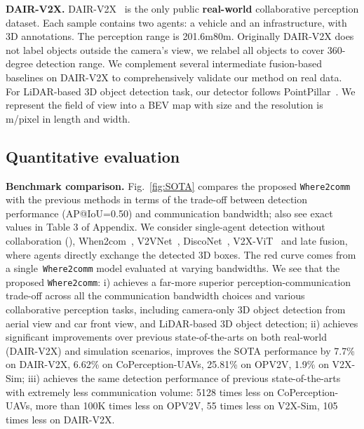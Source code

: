 \documentclass{article}
\begin{document}
\textbf{DAIR-V2X.} DAIR-V2X~\cite{dair} is the only public \textbf{real-world} collaborative perception dataset. Each sample contains two agents: a vehicle and an infrastructure, with 3D annotations. The perception range is 201.6m80m.  Originally DAIR-V2X does not label objects outside the camera's view, we relabel all objects to cover 360-degree detection range. We complement several intermediate fusion-based baselines on DAIR-V2X to comprehensively validate our method on real data. For LiDAR-based 3D object detection task, our detector follows PointPillar~\cite{PointPillar}. We represent the field of view into a BEV map with size  and the resolution is m/pixel in length and width.




\vspace{-2mm}
\subsection{Quantitative evaluation}
\vspace{-2mm}




\textbf{Benchmark comparison.} Fig.~\ref{fig:SOTA} compares the proposed \texttt{Where2comm} with the previous methods in terms of the trade-off between detection performance (AP@IoU=0.50) and communication bandwidth; also see exact values in Table 3 of Appendix. We consider single-agent detection without collaboration (), When2com~\cite{when2com}, V2VNet~\cite{v2vnet}, DiscoNet~\cite{disconet}, V2X-ViT~\cite{xu2022v2x} and late fusion, where agents directly exchange the detected 3D boxes. The red curve comes from a single~\texttt{Where2comm} model evaluated at varying bandwidths. We see that the proposed \texttt{Where2comm}: i) achieves a far-more superior perception-communication trade-off across all the communication bandwidth choices and various collaborative perception tasks, including camera-only 3D object detection from aerial view and car front view, and LiDAR-based 3D object detection; ii) achieves significant improvements over previous state-of-the-arts on both real-world (DAIR-V2X) and simulation scenarios, improves the SOTA performance by 7.7\% on DAIR-V2X, 6.62\% on CoPerception-UAVs, 25.81\% on OPV2V, 1.9\% on V2X-Sim; iii) achieves the same detection performance of previous state-of-the-arts with extremely less communication volume: 5128 times less on CoPerception-UAVs, more than 100K times less on OPV2V, 55 times less on V2X-Sim, 105 times less on DAIR-V2X.
\end{document}
